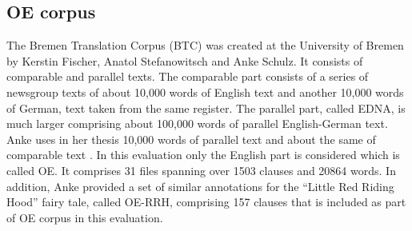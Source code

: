     \begin{table}[!ht]
        \centering
        \caption{Evaluation corpus summary}
        \label{tab:corpus-sumary}
    \end{table}
    
    
    

\subsection{OE corpus}

    The Bremen Translation Corpus (BTC) was created at the University of Bremen by Kerstin Fischer, Anatol Stefanowitsch and Anke Schulz. It consists of comparable and parallel texts. The comparable part consists of a series of newsgroup texts of about 10,000 words of English text and another 10,000 words of German, text taken from the same register. The parallel part, called EDNA, is much larger comprising about 100,000 words of parallel English-German text. Anke uses in her thesis 10,000 words of parallel text and about the same of comparable text \citep[31]{schulz2015me}. In this evaluation only the English part is considered which is called OE. It comprises 31 files spanning over 1503 clauses and 20864 words. In addition, Anke provided a set of similar annotations for the ``Little Red Riding Hood'' fairy tale, called OE-RRH, comprising 157 clauses that is included as part of OE corpus in this evaluation. 
    

